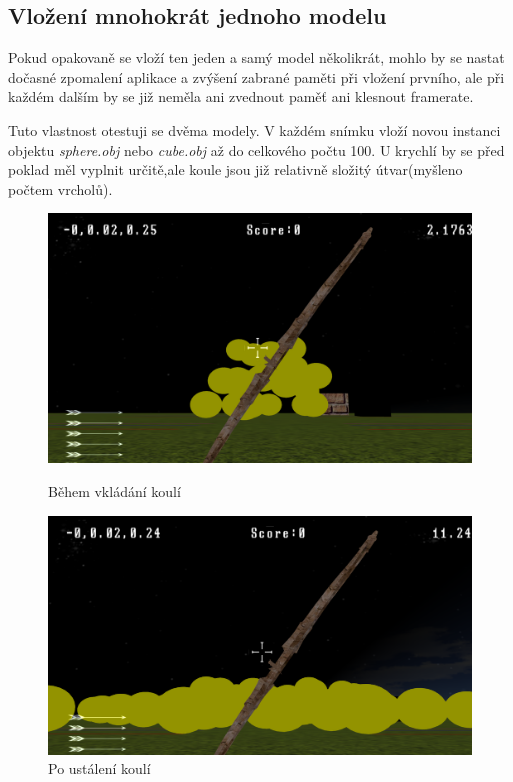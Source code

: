 \subsection{Vložení mnohokrát jednoho modelu}
Pokud opakovaně se vloží ten jeden a samý model několikrát, mohlo by se nastat dočasné zpomalení aplikace a zvýšení zabrané paměti při vložení prvního, ale při každém dalším by se již neměla ani zvednout paměť ani klesnout framerate.

Tuto vlastnost otestuji se dvěma modely. V každém snímku vloží novou instanci objektu \emph{sphere.obj} nebo \emph{cube.obj} až do celkového počtu 100. U krychlí by se před poklad měl vyplnit určitě,ale koule jsou již relativně složitý útvar(myšleno počtem vrcholů).
\begin{figure}[!tbp]
	\centering
	\begin{minipage}[b]{0.4\textwidth}
		\includegraphics[width=\textwidth]{obrazky-figures/19}
		\caption{Během vkládání koulí}
	\end{minipage}
	\hfill
	\begin{minipage}[b]{0.4\textwidth}
		\includegraphics[width=\textwidth]{obrazky-figures/20}
		\caption{Po ustálení koulí}
	\end{minipage}
\end{figure}

